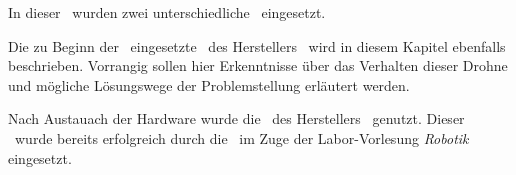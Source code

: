 
In dieser \Arbeit\ wurden zwei unterschiedliche \Quad\ eingesetzt.

Die zu Beginn der \Arbeit\ eingesetzte \Quad\ des Herstellers \COEX\ wird in diesem Kapitel ebenfalls beschrieben. Vorrangig sollen hier Erkenntnisse über das Verhalten dieser Drohne und mögliche Lösungswege der Problemstellung erläutert werden.

Nach Austauach der Hardware wurde die \Ar\ des Herstellers \Parrot\ genutzt. Dieser \Quad\ wurde bereits erfolgreich durch die \DHBW\ im Zuge der Labor-Vorlesung \textit{Robotik} eingesetzt.


